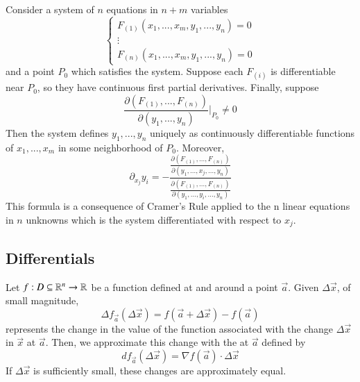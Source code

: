 \documentclass[12pt, a4paper, oneside, openright, titlepage]{book}
\begin{document}
\begin{appendices}
    \begin{namthm}
        Consider a system of $n$ equations in $n+m$ variables \begin{equation}
            \left\{\begin{array}{l} F_{(1)}(x_1,...,x_m,y_1,...,y_n) = 0 \\ \vdots \\ F_{(n)}(x_1,...,x_m,y_1,...,y_n) = 0 \end{array}\right.
        \end{equation}
        and a point $P_0$ which satisfies the system. Suppose each $F_{(i)}$ is differentiable near $P_0$, so they have continuous first partial derivatives. Finally, suppose \begin{equation}
            \frac{\partial(F_{(1)},...,F_{(n)})}{\partial(y_1,...,y_n)}\Big\rvert_{P_0} \neq 0
        \end{equation}
        Then the system defines $y_1,...,y_n$ uniquely as continuously differentiable functions of $x_1,...,x_m$ in some neighborhood of $P_0$. Moreover, \begin{equation}
            \partial_{x_j}y_i = -\frac{\frac{\partial(F_{(1)},...,F_{(n)})}{\partial(y_1,...,x_j,...,y_n)}}{\frac{\partial(F_{(1)},...,F_{(n)})}{\partial(y_1,...,y_i,...,y_n)}}
        \end{equation}
        This formula is a consequence of Cramer's Rule applied to the n linear equations in $n$ unknowns which is the system differentiated with respect to $x_j$.
    \end{namthm}



    \subsection{Differentials}


    \begin{defn}
        Let $f:D\subseteq \mathbb R^n\rightarrow \mathbb R$ be a function defined at and around a point $\vec{a}$. Given $\Delta \vec{x}$, of small magnitude, \begin{equation}
            \Delta f_{\vec{a}}(\Delta \vec{x}) = f(\vec{a}+\Delta \vec{x}) - f(\vec{a})
        \end{equation}
        represents the change in the value of the function associated with the change $\Delta \vec{x}$ in $\vec{x}$ at $\vec{a}$. Then, we approximate this change with the  at $\vec{a}$ defined by \begin{equation}
            df_{\vec{a}}(\Delta \vec{x}) = \nabla f(\vec{a}) \cdot \Delta \vec{x}
        \end{equation}
        If $\Delta \vec{x}$ is sufficiently small, these changes are approximately equal.
    \end{defn}



\end{appendices}
\end{document}
